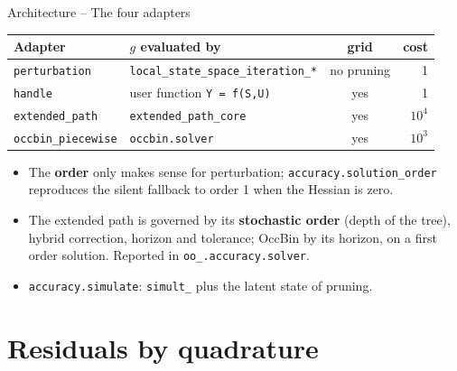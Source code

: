 \documentclass[11pt,aspectratio=169]{beamer}
\newcommand{\code}[1]{\texttt{#1}}
\begin{document}
\begin{frame}{Architecture -- The four adapters}

\begin{center}
    \small
    \renewcommand{\arraystretch}{1.3}
    \begin{tabular}{llcr}
        \toprule
        Adapter & $g$ evaluated by & grid & cost \\
        \midrule
        \code{perturbation} & \code{local\_state\_space\_iteration\_*} & no pruning & 1 \\
        \code{handle} & user function \code{Y = f(S,U)} & yes & 1 \\
        \code{extended\_path} & \code{extended\_path\_core} & yes & $10^4$ \\
        \code{occbin\_piecewise} & \code{occbin.solver} & yes & $10^3$ \\
        \bottomrule
    \end{tabular}
\end{center}

\medskip

\begin{itemize}

\item The \textbf{order} only makes sense for perturbation; \code{accuracy.solution\_order} reproduces the silent fallback to order 1 when the Hessian is zero.\newline

\item The extended path is governed by its \textbf{stochastic order} (depth of the tree), hybrid correction, horizon and tolerance; OccBin by its horizon, on a first order solution. Reported in \code{oo\_.accuracy.solver}.\newline

\item \code{accuracy.simulate}: \code{simult\_} plus the latent state of pruning.

\end{itemize}

\end{frame}

\section{Residuals by quadrature}
\end{document}
